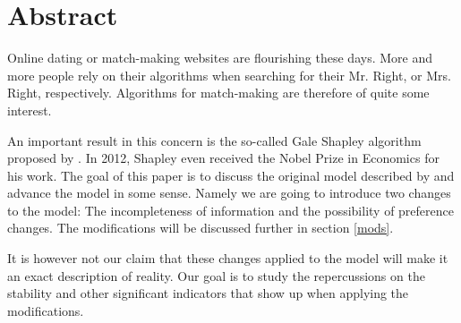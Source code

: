 \documentclass[11pt]{article}
\newcommand{\comment}[1]{}
\begin{document}
\newpage

\tableofcontents

\newpage

\setcounter{page}{1} %




\section{Abstract}

Online dating or match-making websites are flourishing these days. More and more people rely on their algorithms when
searching for their Mr. Right, or Mrs. Right, respectively. Algorithms for match-making are therefore of quite some interest.

An important result in this concern is the so-called Gale Shapley algorithm proposed by  \citet{1962}. In 2012, Shapley even received the Nobel
Prize in Economics for his work. The goal of this paper is to discuss the original model described by \citet{1962} and advance the model in some
sense. Namely we are going to introduce two changes to the model: The incompleteness of information and the possibility of preference changes.
The modifications will be discussed further in section \ref{mods}.

It is however not our claim that these changes applied to the model will make it an exact description of reality. Our goal is to study
the repercussions on the stability and other significant indicators that show up when applying the modifications.


\comment{
\begin{enumerate}
  \item In the original model every node knows all the other nodes of the opposite gender. In a setting like a database of some
  match-making site this may be true. But as soon as the number of nodes gets big, it costs a huge amount of computation time to
  consider all nodes. In reality, information about the nodes of opposite is never complete (this would mean knowing about 3.5 billion people).
  \item It is also conceivable that at some point a node might change its opinion about other nodes and rearrange them in his preference rating
\end{enumerate}

}
\end{document}
